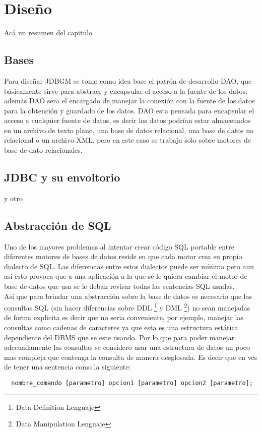 \chapter{Diseño}

Acá un resumen del capitulo






\section{Bases}
Para diseñar JDBGM se tomo como idea base el patrón de desarrollo DAO, que básicamente sirve para abstraer y encapsular el acceso a la fuente de los datos, además DAO sera el encargado de manejar la conexión con la fuente de los datos para la obtención y guardado de los datos.
DAO esta pensada para encapsular el acceso a cualquier fuente de datos, es decir los datos podrían estar almacenados en un archivo de texto plano, una base de datos relacional, una base de datos no relacional o un archivo XML, pero en este caso se trabaja solo sobre motores de base de dato relacionales.  






\section{JDBC y su envoltorio}
y otro






\section{Abstracción de SQL}
Uno de los mayores problemas al intentar crear código SQL portable entre diferentes motores de bases de datos reside en que cada motor crea su propio dialecto de SQL. Las diferencias entre estos dialectos puede ser mínima pero aun así esto provoca que a una aplicación a la que se le quiera cambiar el motor de base de datos que usa se le deban revisar todas las sentencias SQL usadas.\\
Así que para brindar una abstracción sobre la base de datos es necesario que las consultas SQL (sin hacer diferencias sobre DDL \footnote{Data Definition Lenguaje} y DML \footnote{Data Manipulation Lenguaje}) no sean manejadas de forma explicita es decir que no seria conveniente, por ejemplo, manejar las consultas como cadenas de caracteres ya que esta es una estructura estática dependiente del DBMS que se este usando. Por lo que para poder manejar adecuadamente las consultas se considero usar una estructura de datos un poco mas compleja que contenga la consulta de manera desglosada. Es decir que en ves de tener una sentencia como la siguiente:
\begin{Verbatim}
  nombre_comando [parametro] opcion1 [parametro] opcion2 [parametro]; 
\end{Verbatim}

